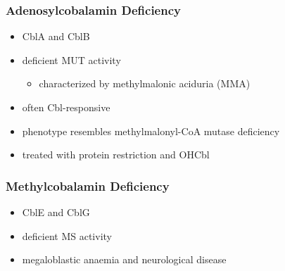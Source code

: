 \documentclass[12pt]{scrartcl}
\begin{document}
\subsubsection{Adenosylcobalamin Deficiency}
\label{sec:orgc1ab226}
\begin{itemize}
\item CblA and CblB
\item deficient MUT activity
\begin{itemize}
\item characterized by methylmalonic aciduria (MMA)
\end{itemize}
\item often Cbl-responsive
\item phenotype resembles methylmalonyl-CoA mutase deficiency
\item treated with protein restriction and OHCbl
\end{itemize}

\subsubsection{Methylcobalamin Deficiency}
\label{sec:org4997ff4}
\begin{itemize}
\item CblE and CblG
\item deficient MS activity
\item megaloblastic anaemia and neurological disease
\end{itemize}
\end{document}
